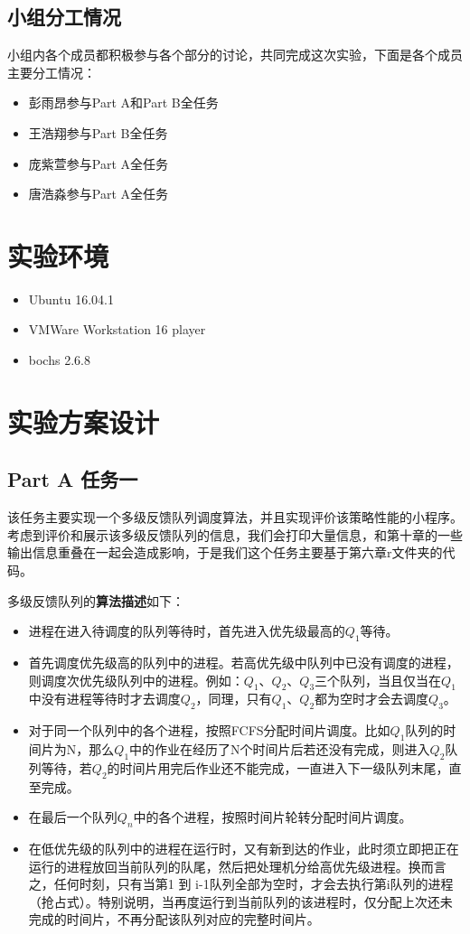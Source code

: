 \documentclass{whureport}
\begin{document}
\subsection{小组分工情况}

小组内各个成员都积极参与各个部分的讨论，共同完成这次实验，下面是各个成员主要分工情况：
\begin{itemize}
  \item 彭雨昂参与Part A和Part B全任务
  \item 王浩翔参与Part B全任务
  \item 庞紫萱参与Part A全任务
  \item 唐浩淼参与Part A全任务
\end{itemize}




\section{实验环境}
\begin{itemize}
  \item Ubuntu 16.04.1
  \item VMWare Workstation 16 player
  \item bochs 2.6.8
\end{itemize}



\section{实验方案设计}
\subsection{Part A 任务一}
该任务主要实现一个多级反馈队列调度算法，并且实现评价该策略性能的小程序。考虑到评价和展示该多级反馈队列的信息，我们会打印大量信息，和第十章的一些输出信息重叠在一起会造成影响，于是我们这个任务主要基于第六章r文件夹的代码。

多级反馈队列的\textbf{算法描述}如下：
\begin{itemize}
  \item 进程在进入待调度的队列等待时，首先进入优先级最高的$Q_1$等待。
  \item 首先调度优先级高的队列中的进程。若高优先级中队列中已没有调度的进程，则调度次优先级队列中的进程。例如：$Q_1$、$Q_2$、$Q_3$三个队列，当且仅当在$Q_1$中没有进程等待时才去调度$Q_2$，同理，只有$Q_1$、$Q_2$都为空时才会去调度$Q_3$。
  \item 对于同一个队列中的各个进程，按照FCFS分配时间片调度。比如$Q_1$队列的时间片为N，那么$Q_1$中的作业在经历了N个时间片后若还没有完成，则进入$Q_2$队列等待，若$Q_2$的时间片用完后作业还不能完成，一直进入下一级队列末尾，直至完成。
  \item 在最后一个队列$Q_n$中的各个进程，按照时间片轮转分配时间片调度。
  \item 在低优先级的队列中的进程在运行时，又有新到达的作业，此时须立即把正在运行的进程放回当前队列的队尾，然后把处理机分给高优先级进程。换而言之，任何时刻，只有当第1 到 i-1队列全部为空时，才会去执行第i队列的进程（抢占式）。特别说明，当再度运行到当前队列的该进程时，仅分配上次还未完成的时间片，不再分配该队列对应的完整时间片。
\end{itemize}
\end{document}
